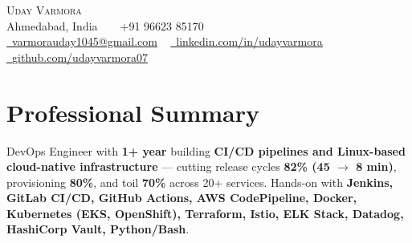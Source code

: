 \documentclass[letterpaper,11pt]{article}
\begin{document}
    \begin{center}
        {\Huge\scshape Uday Varmora}
        \\ Ahmedabad, India ~ \textbar ~ +91 96623 85170\\
        \small
        \href{mailto:varmorauday1045@gmail.com}{\raisebox{-0.2\height}\faEnvelope\  \underline{varmorauday1045@gmail.com}} ~
        \href{https://linkedin.com/in/udayvarmora}{\raisebox{-0.2\height}\faLinkedin\ \underline{linkedin.com/in/udayvarmora}}  ~
        \href{https://github.com/udayvarmora07}{\raisebox{-0.2\height}\faGithub\ \underline{github.com/udayvarmora07}}
    \end{center}

\section{Professional Summary}
\vspace{2pt}
\small{DevOps Engineer with \textbf{1+ year} building \textbf{CI/CD pipelines and Linux-based cloud-native infrastructure} --- cutting release cycles \textbf{82\% (45 $\rightarrow$ 8 min)}, provisioning \textbf{80\%}, and toil \textbf{70\%} across 20+ services. Hands-on with \textbf{Jenkins, GitLab CI/CD, GitHub Actions, AWS CodePipeline, Docker, Kubernetes (EKS, OpenShift), Terraform, Istio, ELK Stack, Datadog, HashiCorp Vault, Python/Bash}.}
\vspace{-2pt}

\end{document}
